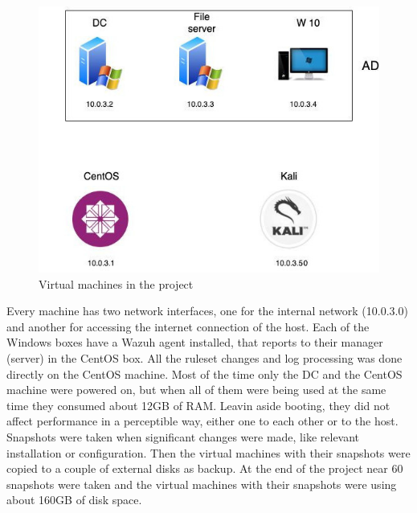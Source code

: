 \begin{figure}[H]
  \centering
	\includegraphics[width=\textwidth]{figuras/virtual_machines.jpg}
	\caption{Virtual machines in the project}
\end{figure}
\linej
Every machine has two network interfaces, one for the internal network (10.0.3.0) and another for accessing the internet connection of the host.
Each of the Windows boxes have a Wazuh agent installed, that reports to their manager (server) in the CentOS box.
All the ruleset changes and log processing was done directly on the CentOS machine.
\linej
\linej
Most of the time only the DC and the CentOS machine were powered on, but when all of them were being used at the same time they consumed about 12GB of RAM. Leavin aside booting, they did not affect performance in a perceptible way, either one to each other or to the host.
\linej
\linej
Snapshots were taken when significant changes were made, like relevant installation or configuration. Then the virtual machines with their snapshots were copied to a couple of external disks as backup. At the end of the project near 60 snapshots were taken and the virtual machines with their snapshots were using about 160GB of disk space.



